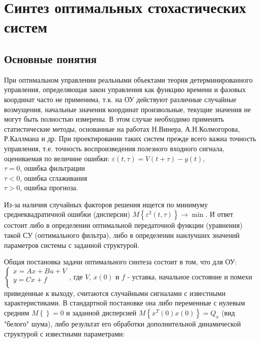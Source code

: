 \documentclass[preprint,russian,a5paper,10pt,twoside,mediummath]{ncc}
\begin{document}
\section{Синтез оптимальных стохастических систем\label{stochastic}}
\subsection{Основные понятия\label{stochastic:general}}
\par При оптимальном управлении реальными объектами теория детерминированного управления, определяющая закон управления как функцию времени и фазовых координат часто не применима, т.к. на ОУ действуют различные случайные возмущения, начальные значения координат произвольные, текущие значения не могут быть полностью измерены. В этом случае необходимо применять статистические методы, основанные на работах Н.Винера, А.Н.Колмогорова, Р.Каллмана и др. При проектировании таких систем прежде всего важна точность управления, т.е. точность воспроизведения полезного входного сигнала, оцениваемая по величине ошибки: $\varepsilon \left( t,\tau  \right)=V\left( t+\tau  \right)-y\left( t \right)$, 
\\$\tau =0$, ошибка фильтрации
\\$\tau <0$, ошибка сглаживания
\\$\tau >0$, ошибка прогноза.
\par Из-за наличия случайных факторов решения ищется по минимуму среднеквадратичной ошибки (дисперсии)   $M\left\{ {{\varepsilon }^{2}}\left( t,\tau  \right) \right\}\to \min $. И ответ состоит либо в определении оптимальной передаточной функции (уравнения) такой СУ (оптимального фильтра), либо в определении наилучших значений параметров системы с заданной структурой. 
\par Общая постановка задачи оптимального синтеза состоит в том, что для ОУ: 
$\left\{ \begin{array}{*{35}{l}}
   \dot{x}=Ax+Bu+V  \\
   y=Cx+f  \\
\end{array} \right.$, где $V$, $x\left( 0 \right)$ и $f$ - уставка, начальное состояние и помехи приведенные к выходу, считаются случайными сигналами с известными характеристиками. В стандартной постановке она либо переменные с нулевым средним $M\left\{ {} \right\}=0$ и заданной дисперсией 
$M\left\{ {{x}^{T}}\left( 0 \right)x\left( 0 \right) \right\}={{Q}_{x}}$ (вид "белого" шума), либо результат его обработки дополнительной динамической структурой с известными параметрами:
\end{document}
